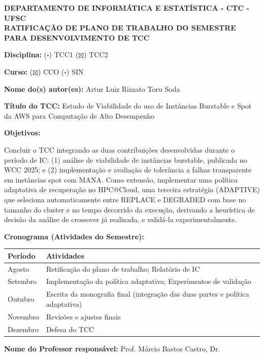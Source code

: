 \documentclass[12pt, a4paper]{article}
\begin{document}
\begin{center}
    \textbf{DEPARTAMENTO DE INFORMÁTICA E ESTATÍSTICA - CTC - UFSC}\\[0.4em]
    \textbf{RATIFICAÇÃO DE PLANO DE TRABALHO DO SEMESTRE PARA DESENVOLVIMENTO DE TCC}
\end{center}

\vspace{1em}

\noindent\textbf{Disciplina:} \quad ($\square$) TCC1 \quad ($\boxtimes$) TCC2

\noindent\textbf{Curso:} \quad ($\boxtimes$) CCO \quad ($\square$) SIN

\vspace{1em}

\noindent\textbf{Nome do(s) autor(es):} Artur Luiz Rizzato Toru Soda

\vspace{1em}

\noindent\textbf{Título do TCC:} Estudo de Viabilidade do uso de Instâncias Burstable e Spot da AWS para Computação de Alto Desempenho

\vspace{1.5em}

\noindent\textbf{Objetivos:}

\noindent Concluir o TCC integrando as duas contribuições desenvolvidas durante o período de IC:
(1) análise de viabilidade de instâncias burstable, publicada no WCC 2025; e
(2) implementação e avaliação de tolerância a falhas transparente em instâncias spot com MANA.
Como extensão, implementar uma política adaptativa de recuperação no HPC@Cloud, uma
terceira estratégia (ADAPTIVE) que seleciona automaticamente entre REPLACE e DEGRADED
com base no tamanho do cluster e no tempo decorrido da execução, derivando a heurística
de decisão da análise de crossover já realizada, e validá-la experimentalmente.

\vspace{1.5em}

\noindent\textbf{Cronograma (Atividades do Semestre):}

\vspace{0.5em}

\noindent
\begin{tabular}{@{} p{3cm} p{10cm} @{}}
    \toprule
    \textbf{Período} & \textbf{Atividades} \\
    \midrule
    Agosto    & Retificação do plano de trabalho; Relatório de IC \\
    Setembro  & Implementação da política adaptativa; Experimentos de validação \\
    Outubro   & Escrita da monografia final (integração das duas partes e política adaptativa) \\
    Novembro  & Revisões e ajustes finais \\
    Dezembro  & Defesa do TCC \\
    \bottomrule
\end{tabular}

\vspace{2em}

\noindent\textbf{Nome do Professor responsável:} Prof. Márcio Bastos Castro, Dr.
\end{document}
